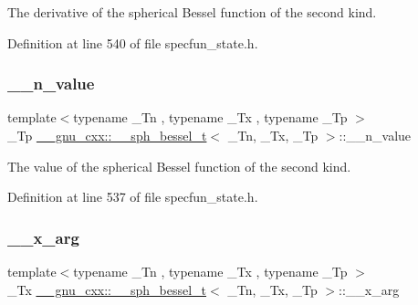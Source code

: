 The derivative of the spherical Bessel function of the second kind. 



Definition at line 540 of file specfun\+\_\+state.\+h.

\mbox{\label{struct____gnu__cxx_1_1____sph__bessel__t_ad846c3cb00bfabcbddc3e2f6512e3d7f}} 
\subsubsection{\texorpdfstring{\+\_\+\+\_\+n\+\_\+value}{\_\_n\_value}}
{\footnotesize\ttfamily template$<$typename \+\_\+\+Tn , typename \+\_\+\+Tx , typename \+\_\+\+Tp $>$ \\
\+\_\+\+Tp \hyperlink{struct____gnu__cxx_1_1____sph__bessel__t}{\+\_\+\+\_\+gnu\+\_\+cxx\+::\+\_\+\+\_\+sph\+\_\+bessel\+\_\+t}$<$ \+\_\+\+Tn, \+\_\+\+Tx, \+\_\+\+Tp $>$\+::\+\_\+\+\_\+n\+\_\+value}



The value of the spherical Bessel function of the second kind. 



Definition at line 537 of file specfun\+\_\+state.\+h.

\mbox{\label{struct____gnu__cxx_1_1____sph__bessel__t_afa9cf4b1888081bd21716c58ed19719b}} 
\subsubsection{\texorpdfstring{\+\_\+\+\_\+x\+\_\+arg}{\_\_x\_arg}}
{\footnotesize\ttfamily template$<$typename \+\_\+\+Tn , typename \+\_\+\+Tx , typename \+\_\+\+Tp $>$ \\
\+\_\+\+Tx \hyperlink{struct____gnu__cxx_1_1____sph__bessel__t}{\+\_\+\+\_\+gnu\+\_\+cxx\+::\+\_\+\+\_\+sph\+\_\+bessel\+\_\+t}$<$ \+\_\+\+Tn, \+\_\+\+Tx, \+\_\+\+Tp $>$\+::\+\_\+\+\_\+x\+\_\+arg}



